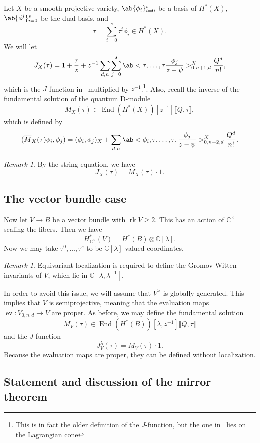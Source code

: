 \documentclass[leqno, openany]{memoir}
\theoremstyle{definition}
\theoremstyle{remark}
\newtheorem{rmk}[thm]{Remark}
\theoremstyle{plain}
\theoremstyle{definition}
\theoremstyle{remark}
\newcommand{\C}{\mathbb{C}}
\newcommand{\M}{\overline{M}}
\newcommand{\on}[1]{\operatorname{#1}}
\DeclareMathOperator{\End}{End}
\begin{document}
Let $X$ be a smooth projective variety, $\ab\{ \phi_i\}_{i=0}^s$ be a basis of $H^*(X)$, $\ab\{\phi^i\}_{i=0}^s$ be the dual basis, and 
\[ \tau = \sum_{i=0}^s \tau^i \phi_i \in H^*(X). \]
We will let
\[ J_X(\tau) = 1 + \frac{\tau}{z} + z^{-1} \sum_{d,n} \sum_{j=0}^s \ab<\tau, \ldots, \tau \frac{\phi_j}{z-\psi}>_{0,n+1,d}^X \frac{Q^d}{n!}, \]
which is the $J$-function in~ multiplied by $z^{-1}$.\footnote{This is in fact the older definition of the $J$-function, but the one in~ lies on the Lagrangian cone}. Also, recall the inverse of the fundamental solution of the quantum D-module
\[ M_X(\tau) \in \End(H^*(X))[z^{-1}]\llbracket Q,\tau \rrbracket, \]
which is defined by
\[ (\M_X(\tau) \phi_i, \phi_j) = (\phi_i, \phi_j)_X + \sum_{d,n} \ab<\phi_i,\tau, \ldots, \tau, \frac{\phi_j}{z-\psi}>_{0,n+2,d}^X \frac{Q^d}{n!}. \]

\begin{rmk}
    By the string equation, we have
    \[ J_X(\tau) = M_X(\tau) \cdot 1. \]
\end{rmk}

\subsection{The vector bundle case}%
\label{sub:The vector bundle case}


Now let $V \to B$ be a vector bundle with $\on{rk} V \geq 2$. This has an action of $\C^{\times}$ scaling the fibers. Then we have
\[ H_{\C^{\times}}^*(V) = H^*(B) \otimes \C[\lambda]. \]
Now we may take $\tau^0, \ldots, \tau^s$ to be $\C[\lambda]$-valued coordinates.

\begin{rmk}
    Equivariant localization is required to define the Gromov-Witten invariants of $V$, which lie in $\C[\lambda, \lambda^{-1}]$.
\end{rmk}

In order to avoid this issue, we will assume that $V^{\vee}$ is globally generated. This implies that $V$ is semiprojective, meaning that the evaluation maps $\on{ev} \colon V_{0,n,d} \to V$ are proper. As before, we may define the fundamental solution
\[ M_V(\tau) \in \End(H^*(B))[\lambda, z^{-1}] \llbracket Q, \tau \rrbracket \]
and the $J$-function
\[ J_V^{\lambda}(\tau) = M_V(\tau) \cdot 1. \]
Because the evaluation maps are proper, they can be defined without localization.

\subsection{Statement and discussion of the mirror theorem}%
\label{sub:Statement and discussion of the mirror theorem}
\end{document}
